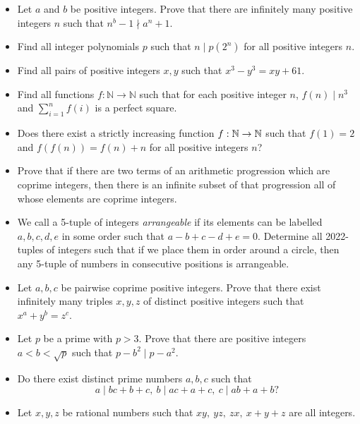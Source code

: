 \begin{itemize}
  \item Let $a$ and $b$ be positive integers. Prove that there are infinitely
    many positive integers $n$ such that $n^b-1\nmid a^n+1$.
  \item Find all integer polynomials $p$ such that $n\mid p(2^n)$ for all
    positive integers $n$.
  \item Find all pairs of positive integers $x,y$ such that $x^3-y^3=xy+61$.
  \item Find all functions $f:\mathbb N\to\mathbb N$ such that for each positive
    integer $n$, $f(n)\mid n^3$ and $\displaystyle\sum_{i=1}^n f(i)$ is a perfect
    square.
  \item Does there exist a strictly increasing function $f:\mathbb{N}\to\mathbb{N}$ such that
    $f(1)=2$ and $f(f(n))=f(n)+n$ for all positive integers $n$?
  \item Prove that if there are two terms of an arithmetic progression which are
    coprime integers, then there is an infinite subset of that
    progression all of whose elements are coprime integers.
    \item We call a 5-tuple of integers \emph{arrangeable} if its elements can be
      labelled $a,b,c,d,e$ in some order such that $a-b+c-d+e=0$. Determine all
      2022-tuples of integers such that if we place them in order around a
      circle, then any 5-tuple of numbers in consecutive positions is
      arrangeable.
  \item Let $a,b,c$ be pairwise coprime positive integers. Prove that there
    exist infinitely many triples $x,y,z$ of distinct positive integers such
    that $x^a+y^b=z^c$.
    \item Let $p$ be a prime with $p>3$. Prove that there are positive integers
      $a<b<\sqrt p$ such that $p-b^2\mid p-a^2$.
    \item
        Do there exist distinct prime numbers $a,b,c$ such that
          \[a\mid bc+b+c,\ b\mid ac+a+c,\ c\mid ab+a+b?\]
  \item Let $x,y,z$ be rational numbers such that $xy,\ yz,\ zx,\ x+y+z$ are all
    integers.


\end{itemize}
